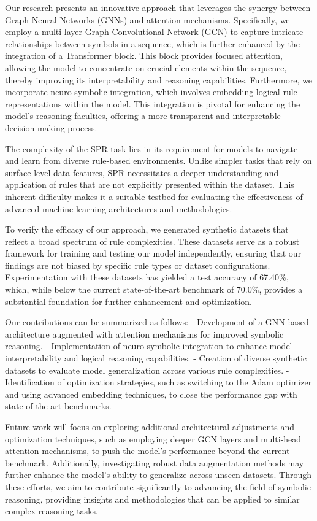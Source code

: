 \documentclass{article}
\begin{document}
Our research presents an innovative approach that leverages the synergy between Graph Neural Networks (GNNs) and attention mechanisms. Specifically, we employ a multi-layer Graph Convolutional Network (GCN) to capture intricate relationships between symbols in a sequence, which is further enhanced by the integration of a Transformer block. This block provides focused attention, allowing the model to concentrate on crucial elements within the sequence, thereby improving its interpretability and reasoning capabilities. Furthermore, we incorporate neuro-symbolic integration, which involves embedding logical rule representations within the model. This integration is pivotal for enhancing the model's reasoning faculties, offering a more transparent and interpretable decision-making process.

The complexity of the SPR task lies in its requirement for models to navigate and learn from diverse rule-based environments. Unlike simpler tasks that rely on surface-level data features, SPR necessitates a deeper understanding and application of rules that are not explicitly presented within the dataset. This inherent difficulty makes it a suitable testbed for evaluating the effectiveness of advanced machine learning architectures and methodologies.

To verify the efficacy of our approach, we generated synthetic datasets that reflect a broad spectrum of rule complexities. These datasets serve as a robust framework for training and testing our model independently, ensuring that our findings are not biased by specific rule types or dataset configurations. Experimentation with these datasets has yielded a test accuracy of 67.40\%, which, while below the current state-of-the-art benchmark of 70.0\%, provides a substantial foundation for further enhancement and optimization.

Our contributions can be summarized as follows:
- Development of a GNN-based architecture augmented with attention mechanisms for improved symbolic reasoning.
- Implementation of neuro-symbolic integration to enhance model interpretability and logical reasoning capabilities.
- Creation of diverse synthetic datasets to evaluate model generalization across various rule complexities.
- Identification of optimization strategies, such as switching to the Adam optimizer and using advanced embedding techniques, to close the performance gap with state-of-the-art benchmarks.

Future work will focus on exploring additional architectural adjustments and optimization techniques, such as employing deeper GCN layers and multi-head attention mechanisms, to push the model's performance beyond the current benchmark. Additionally, investigating robust data augmentation methods may further enhance the model's ability to generalize across unseen datasets. Through these efforts, we aim to contribute significantly to advancing the field of symbolic reasoning, providing insights and methodologies that can be applied to similar complex reasoning tasks.
\end{document}
